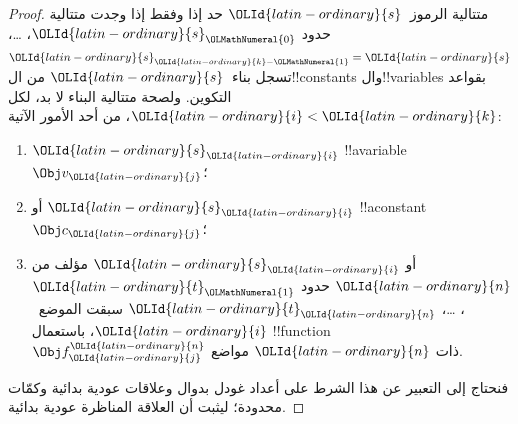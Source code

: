 \documentclass[../../../include/open-logic-section]{subfiles}
\begin{document}
\begin{proof}
متتالية الرموز~$\OLId{latin-ordinary}{s}$ حد إذا وفقط إذا وجدت
متتالية حدود $\OLId{latin-ordinary}{s}_\OLMathNumeral{0}$، \dots، $\OLId{latin-ordinary}{s}_{\OLId{latin-ordinary}{k}-\OLMathNumeral{1}}=\OLId{latin-ordinary}{s}$
تسجل بناء~$\OLId{latin-ordinary}{s}$ من ال!!{constant}s
وال!!{variable}s بقواعد التكوين.
ولصحة متتالية البناء لا بد، لكل $\OLId{latin-ordinary}{i}<\OLId{latin-ordinary}{k}$،
من أحد الأمور الآتية:
\begin{enumerate}
\item $\OLId{latin-ordinary}{s}_\OLId{latin-ordinary}{i}$ !!a{variable}~$\Obj v_\OLId{latin-ordinary}{j}$؛
\item أو $\OLId{latin-ordinary}{s}_\OLId{latin-ordinary}{i}$ !!a{constant}~$\Obj c_\OLId{latin-ordinary}{j}$؛
\item أو $\OLId{latin-ordinary}{s}_\OLId{latin-ordinary}{i}$ مؤلف من $\OLId{latin-ordinary}{n}$ حدود
  $\OLId{latin-ordinary}{t}_\OLMathNumeral{1}$، \dots، $\OLId{latin-ordinary}{t}_\OLId{latin-ordinary}{n}$ سبقت الموضع~$\OLId{latin-ordinary}{i}$،
  باستعمال !!{function}~$\Obj f^\OLId{latin-ordinary}{n}_\OLId{latin-ordinary}{j}$ ذات $\OLId{latin-ordinary}{n}$ مواضع.
\end{enumerate}
فنحتاج إلى التعبير عن هذا الشرط على أعداد غودل
بدوال وعلاقات عودية بدائية وكمّات محدودة؛
ليثبت أن العلاقة المناظرة عودية بدائية.


\end{proof}
\end{document}
